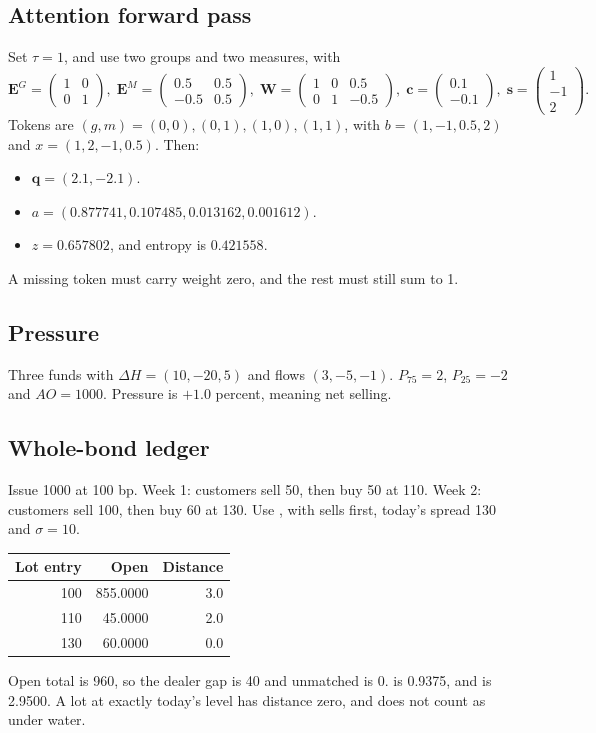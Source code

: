 \documentclass[11pt]{article}
\newcommand{\code}[1]{\texttt{\detokenize{#1}}}
\begin{document}
\subsection{Attention forward pass}
Set $\tau = 1$, and use two groups and two measures, with
\[
\mathbf{E}^G = \begin{pmatrix}1 & 0\\ 0 & 1\end{pmatrix},\;
\mathbf{E}^M = \begin{pmatrix}0.5 & 0.5\\ -0.5 & 0.5\end{pmatrix},\;
\mathbf{W} = \begin{pmatrix}1 & 0 & 0.5\\ 0 & 1 & -0.5\end{pmatrix},\;
\mathbf{c} = \begin{pmatrix}0.1\\ -0.1\end{pmatrix},\;
\mathbf{s} = \begin{pmatrix}1\\ -1\\ 2\end{pmatrix}.
\]
Tokens are $(g,m) = (0,0), (0,1), (1,0), (1,1)$, with $b = (1, -1, 0.5, 2)$ and $x = (1, 2, -1, 0.5)$. Then:
\begin{itemize}
\item $\mathbf{q} = (2.1, -2.1)$.
\item $a = (0.877741, 0.107485, 0.013162, 0.001612)$.
\item $z = 0.657802$, and entropy is $0.421558$.
\end{itemize}
A missing token must carry weight zero, and the rest must still sum to 1.

\subsection{Pressure}
Three funds with $\Delta H = (10, -20, 5)$ and flows $(3, -5, -1)$. $P_{75} = 2$, $P_{25} = -2$ and $AO = 1000$. Pressure is $+1.0$ percent, meaning net selling.

\subsection{Whole-bond ledger}
Issue 1000 at 100 bp. Week 1: customers sell 50, then buy 50 at 110. Week 2: customers sell 100, then buy 60 at 130. Use \code{PRO_RATA}, with sells first, today's spread 130 and $\sigma = 10$.
\begin{center}\small
\begin{tabular}{@{}rrr@{}}
\toprule
Lot entry & Open & Distance \\
\midrule
100 & 855.0000 & 3.0 \\
110 & 45.0000 & 2.0 \\
130 & 60.0000 & 0.0 \\
\bottomrule
\end{tabular}
\end{center}
Open total is 960, so the dealer gap is 40 and unmatched is 0. \code{pain_share} is 0.9375, and \code{depth} is 2.9500. A lot at exactly today's level has distance zero, and does not count as under water.
\end{document}
